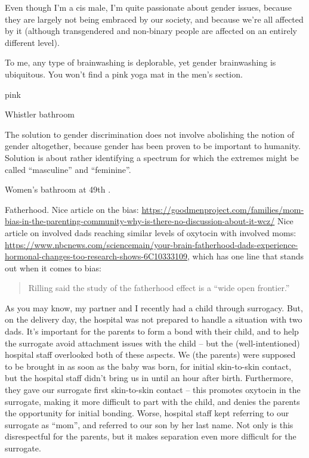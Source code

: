 \documentclass[]{article}
\begin{document}
Even though I'm a cis male, I'm quite passionate about gender issues, because they are largely not being embraced by our society, and because we're all affected by it (although transgendered and non-binary people are affected on an entirely different level).

To me, any type of brainwashing is deplorable, yet gender brainwashing is ubiquitous. You won't find a pink yoga mat in the men's section.

pink

Whistler bathroom

The solution to gender discrimination does not involve abolishing the notion of gender altogether, because gender has been proven to be important to humanity. Solution is about rather identifying a spectrum for which the extremes might be called ``masculine'' and ``feminine''.

Women's bathroom at 49th \textbar\textbar.

Fatherhood. Nice article on the bias: \url{https://goodmenproject.com/families/mom-bias-in-the-parenting-community-why-is-there-no-discussion-about-it-wcz/}
Nice article on involved dads reaching similar levels of oxytocin with involved moms: \url{https://www.nbcnews.com/sciencemain/your-brain-fatherhood-dads-experience-hormonal-changes-too-research-shows-6C10333109}, which has one line that stands out when it comes to bias:

\begin{quote}
Rilling said the study of the fatherhood effect is a ``wide open frontier.''
\end{quote}

As you may know, my partner and I recently had a child through surrogacy. But, on the delivery day, the hospital was not prepared to handle a situation with two dads. It's important for the parents to form a bond with their child, and to help the surrogate avoid attachment issues with the child -- but the (well-intentioned) hospital staff overlooked both of these aspects. We (the parents) were supposed to be brought in as soon as the baby was born, for initial skin-to-skin contact, but the hospital staff didn't bring us in until an hour after birth. Furthermore, they gave our surrogate first skin-to-skin contact -- this promotes oxytocin in the surrogate, making it more difficult to part with the child, and denies the parents the opportunity for initial bonding. Worse, hospital staff kept referring to our surrogate as ``mom'', and referred to our son by her last name. Not only is this disrespectful for the parents, but it makes separation even more difficult for the surrogate.
\end{document}

